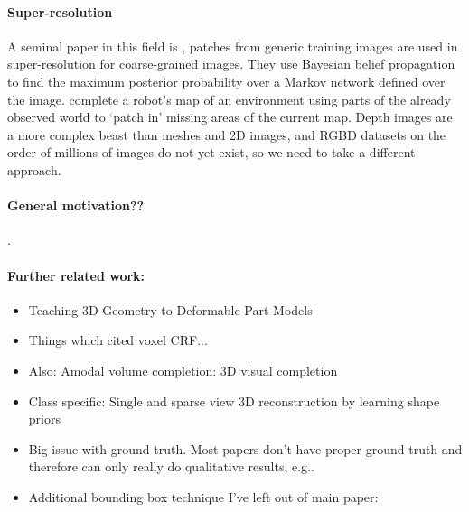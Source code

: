 \documentclass[10pt,twocolumn,letterpaper]{article}
\makeatletter
\renewcommand*{\eg}{e.g.\@\xspace}
\makeatother
\begin{document}
\paragraph{Super-resolution}
A seminal paper in this field is \cite{freeman-ijcv-2000}, patches from generic training images are used in super-resolution for coarse-grained images. They use Bayesian belief propagation to find the maximum posterior probability over a Markov network defined over the image.
\cite{chang-tor-2007} complete a robot's map of an environment using parts of the already observed world to  `patch in' missing areas of the current map.
Depth images are a more complex beast than meshes and 2D images, and RGBD datasets on the order of millions of images do not yet exist, so we need to take a different approach.


\paragraph{General motivation??}
\cite{nan-acm-2012}.


\paragraph{Further related work:}
\begin{itemize}
\item Teaching 3D Geometry to Deformable Part Models
\item Things which cited voxel CRF...
\item Also: Amodal volume completion: 3D visual completion
\item Class specific: Single and sparse view 3D reconstruction by learning shape priors
\item Big issue with ground truth. Most papers don't have proper ground truth and therefore can only really do qualitative results, \eg \cite{all the papers...}.
\item Additional bounding box technique I've left out of main paper:
\cite{choi-cvpr-2013}
\end{itemize}

{\small
%


}
\end{document}
